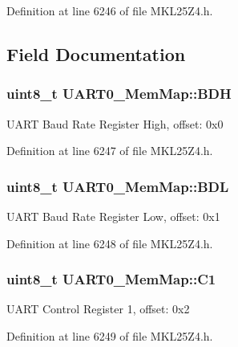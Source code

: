 Definition at line 6246 of file M\+K\+L25\+Z4.\+h.



\subsection{Field Documentation}
\subsubsection[{\texorpdfstring{B\+DH}{BDH}}]{\setlength{\rightskip}{0pt plus 5cm}uint8\+\_\+t U\+A\+R\+T0\+\_\+\+Mem\+Map\+::\+B\+DH}\hypertarget{struct_u_a_r_t0___mem_map_a411dcb9ed04cf79fe75d29e9636b435c}{}\label{struct_u_a_r_t0___mem_map_a411dcb9ed04cf79fe75d29e9636b435c}
U\+A\+RT Baud Rate Register High, offset\+: 0x0 

Definition at line 6247 of file M\+K\+L25\+Z4.\+h.

\subsubsection[{\texorpdfstring{B\+DL}{BDL}}]{\setlength{\rightskip}{0pt plus 5cm}uint8\+\_\+t U\+A\+R\+T0\+\_\+\+Mem\+Map\+::\+B\+DL}\hypertarget{struct_u_a_r_t0___mem_map_a0cfc5d11f450bc767b9e0f8cb15cbfd1}{}\label{struct_u_a_r_t0___mem_map_a0cfc5d11f450bc767b9e0f8cb15cbfd1}
U\+A\+RT Baud Rate Register Low, offset\+: 0x1 

Definition at line 6248 of file M\+K\+L25\+Z4.\+h.

\subsubsection[{\texorpdfstring{C1}{C1}}]{\setlength{\rightskip}{0pt plus 5cm}uint8\+\_\+t U\+A\+R\+T0\+\_\+\+Mem\+Map\+::\+C1}\hypertarget{struct_u_a_r_t0___mem_map_ad2751b249e6fcca4924bbd0f431e96e1}{}\label{struct_u_a_r_t0___mem_map_ad2751b249e6fcca4924bbd0f431e96e1}
U\+A\+RT Control Register 1, offset\+: 0x2 

Definition at line 6249 of file M\+K\+L25\+Z4.\+h.


